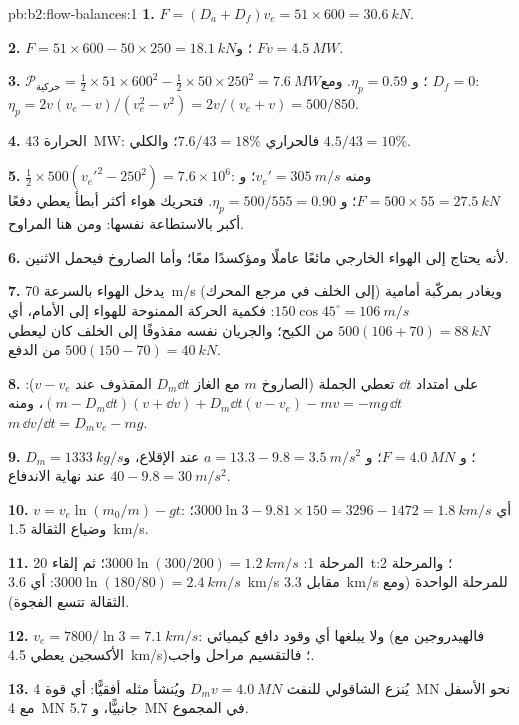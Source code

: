 \begin{solution}{pb:b2:flow-balances:1}
\textbf{1.} $F = (D_a + D_f)v_e = 51 \times 600 = \qty{30.6}{kN}$.

\textbf{2.} $F = 51 \times 600 - 50 \times 250 = \qty{18.1}{kN}$؛ و $Fv = \qty{4.5}{MW}$.

\textbf{3.} $\mathcal P_{\text{حركية}} = \tfrac12 \times 51 \times 600^2 - \tfrac12 \times 50 \times 250^2 =
\qty{7.6}{MW}$؛ و $\eta_p = 0.59$. ومع $D_f = 0$: $\eta_p = 2v(v_e - v)/(v_e^2 - v^2)
= 2v/(v_e + v) = 500/850$.

\textbf{4.} الحرارة \qty{43}{MW}: فالحراري $7.6/43 = 18\%$؛ والكلي $4.5/43 = 10\%$.

\textbf{5.} $\tfrac12 \times 500(v_e'^2 - 250^2) = 7.6 \times 10^6$: ومنه $v_e' = \qty{305}{m/s}$؛
و $F = 500 \times 55 = \qty{27.5}{kN}$؛ و $\eta_p = 500/555 = 0.90$. فتحريك هواء أكثر
أبطأ يعطي دفعًا أكبر بالاستطاعة نفسها: ومن هنا المراوح.

\textbf{6.} لأنه يحتاج إلى الهواء الخارجي مائعًا عاملًا ومؤكسدًا معًا؛
وأما الصاروخ فيحمل الاثنين.

\textbf{7.} يدخل الهواء بالسرعة \qty{70}{m/s} (إلى الخلف في مرجع المحرك)
ويغادر بمركّبة أمامية $150\cos45^\circ = \qty{106}{m/s}$: فكمية الحركة
الممنوحة للهواء إلى الأمام، أي $500(106 + 70) = \qty{88}{kN}$ من
الكبح؛ والجريان نفسه مقذوفًا إلى الخلف كان ليعطي $500(150 - 70) =
\qty{40}{kN}$ من الدفع.

\textbf{8.} على امتداد $\dd t$ تعطي الجملة (الصاروخ $m$ مع الغاز $D_m\dd t$ المقذوف عند
$v - v_e$): $(m - D_m\dd t)(v + \dd v) + D_m\dd t(v - v_e) - mv = -mg\,\dd t$،
ومنه $m\,\dd v/\dd t = D_mv_e - mg$.

\textbf{9.} $D_m = \qty{1333}{kg/s}$؛ و $F = \qty{4.0}{MN}$؛ و $a = 13.3 - 9.8 =
\qty{3.5}{m/s^2}$ عند الإقلاع، و $40 - 9.8 = \qty{30}{m/s^2}$ عند نهاية الاندفاع.

\textbf{10.} $v = v_e\ln(m_0/m) - gt$: أي $3000\ln3 - 9.81 \times 150 = 3296 - 1472 =
\qty{1.8}{km/s}$؛ وضياع الثقالة \qty{1.5}{km/s}.

\textbf{11.} المرحلة 1: $3000\ln(300/200) = \qty{1.2}{km/s}$؛ ثم إلقاء \qty{20}{t}؛ والمرحلة
2: $3000\ln(180/80) = \qty{2.4}{km/s}$: أي \qty{3.6}{km/s} مقابل \qty{3.3}{km/s}
للمرحلة الواحدة (ومع الثقالة تتسع الفجوة).

\textbf{12.} $v_e = 7800/\ln3 = \qty{7.1}{km/s}$: ولا يبلغها أي وقود دافع
كيميائي (فالهيدروجين مع الأكسجين يعطي \qty{4.5}{km/s})؛ فالتقسيم مراحل واجب.

\textbf{13.} يُنزع  الشاقولي للنفث $D_mv = \qty{4.0}{MN}$
ويُنشأ مثله أفقيًّا: أي قوة \qty{4}{MN} نحو الأسفل
مع \qty{4}{MN} جانبيًّا، و \qty{5.7}{MN} في المجموع.


\end{solution}
